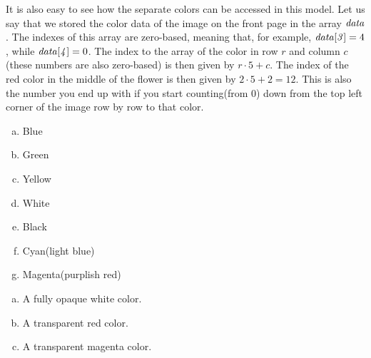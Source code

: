 It is also easy to see how the separate colors can be accessed in this
model. Let us say that we stored the color data of the image on the
front page in the array $\mathit{data}$. The indexes of this array are
zero-based, meaning that, for example, $\mathit{data[3]}=4$, while
$\mathit{data[4]}=0$. The index to the array of the color in row $r$ and column
$c$(these numbers are also zero-based) is then given by $r \cdot 5 +
c$. The index of the red color in the middle of the flower is then
given by $2 \cdot 5 + 2 = 12$. This is also the number you end up with
if you start counting(from $0$) down from the top left corner of the
image row by row to that color.

\answers{}

\begin{Answer}[ref={rgb-triplet}]
  \begin{enumerate}[(a)]
  \item Blue
  \item Green
  \item Yellow
  \item White
  \item Black
  \item Cyan(light blue)
  \item Magenta(purplish red)
  \end{enumerate}
\end{Answer}

\begin{Answer}[ref={tga-16-bit}]

  \begin{enumerate}[(a)]
  \item A fully opaque white color.
  \item A transparent red color.
  \item A transparent magenta color.
  \end{enumerate}

\end{Answer}

